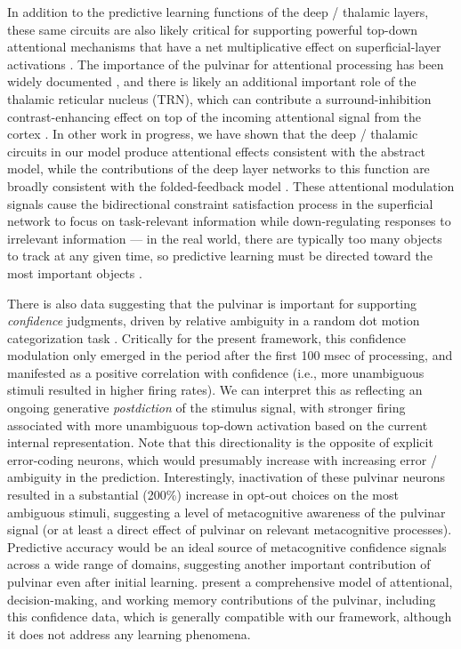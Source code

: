 \documentclass[11pt,twoside]{article}
\newif\myifpdf
\begin{document}
In addition to the predictive learning functions of the deep / thalamic layers, these same circuits are also likely critical for supporting powerful top-down attentional mechanisms that have a net multiplicative effect on superficial-layer activations \citep{BortoneOlsenScanziani14,OlsenBortoneAdesnikEtAl12,BortoneOlsenScanziani14,OlsenBortoneAdesnikEtAl12}. The importance of the pulvinar for attentional processing has been widely documented \cite[e.g.,]{LaBergeBuchsbaum90,BenderYouakim01,SaalmannPinskWangEtAl12}, and there is likely an additional important role of the thalamic reticular nucleus (TRN), which can contribute a surround-inhibition contrast-enhancing effect on top of the incoming attentional signal from the cortex \citep{Crick84,Pinault04,WimmerSchmittDavidsonEtAl15,JaramilloMejiasWang19}. In other work in progress, we have shown that the deep / thalamic circuits in our model produce attentional effects consistent with the abstract \citet{ReynoldsHeeger09} model, while the contributions of the deep layer networks to this function are broadly consistent with the folded-feedback model \citep{Grossberg99}.  These attentional modulation signals cause the bidirectional constraint satisfaction process in the superficial network to focus on task-relevant information while down-regulating responses to irrelevant information --- in the real world, there are typically too many objects to track at any given time, so predictive learning must be directed toward the most important objects \citep{Pylyshyn89,CavanaghHuntAfrazEtAl10,RichterdeLange19}.

There is also data suggesting that the pulvinar is important for supporting \emph{confidence} judgments, driven by relative ambiguity in a random dot motion categorization task \citep{KomuraNikkuniHirashimaEtAl13}.  Critically for the present framework, this confidence modulation only emerged in the period after the first 100 msec of processing, and manifested as a positive correlation with confidence (i.e., more unambiguous stimuli resulted in higher firing rates).  We can interpret this as reflecting an ongoing generative \emph{postdiction} of the stimulus signal, with stronger firing associated with more unambiguous top-down activation based on the current internal representation.  Note that this directionality is the opposite of explicit error-coding neurons, which would presumably increase with increasing error / ambiguity in the prediction.  Interestingly, inactivation of these pulvinar neurons resulted in a substantial (200\%) increase in opt-out choices on the most ambiguous stimuli, suggesting a level of metacognitive awareness of the pulvinar signal (or at least a direct effect of pulvinar on relevant metacognitive processes).  Predictive accuracy would be an ideal source of metacognitive confidence signals across a wide range of domains, suggesting another important contribution of pulvinar even after initial learning.  \citet{JaramilloMejiasWang19} present a comprehensive model of attentional, decision-making, and working memory contributions of the pulvinar, including this confidence data, which is generally compatible with our framework, although it does not address any learning phenomena.
\end{document}

